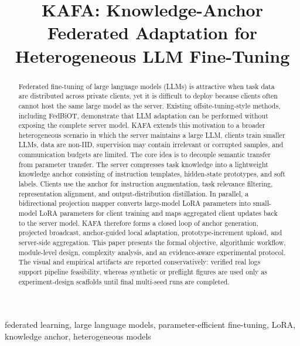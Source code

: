 \documentclass[conference]{IEEEtran}
\begin{document}
\title{KAFA: Knowledge-Anchor Federated Adaptation for Heterogeneous LLM Fine-Tuning}

\author{
}

\maketitle

\begin{abstract}
Federated fine-tuning of large language models (LLMs) is attractive when task data are distributed across private clients, yet it is difficult to deploy because clients often cannot host the same large model as the server. Existing offsite-tuning-style methods, including FedBiOT, demonstrate that LLM adaptation can be performed without exposing the complete server model. KAFA extends this motivation to a broader heterogeneous scenario in which the server maintains a large LLM, clients train smaller LLMs, data are non-IID, supervision may contain irrelevant or corrupted samples, and communication budgets are limited. The core idea is to decouple semantic transfer from parameter transfer. The server compresses task knowledge into a lightweight knowledge anchor consisting of instruction templates, hidden-state prototypes, and soft labels. Clients use the anchor for instruction augmentation, task relevance filtering, representation alignment, and output-distribution distillation. In parallel, a bidirectional projection mapper converts large-model LoRA parameters into small-model LoRA parameters for client training and maps aggregated client updates back to the server model. KAFA therefore forms a closed loop of anchor generation, projected broadcast, anchor-guided local adaptation, prototype-increment upload, and server-side aggregation. This paper presents the formal objective, algorithmic workflow, module-level design, complexity analysis, and an evidence-aware experimental protocol. The visual and empirical artifacts are reported conservatively: verified real logs support pipeline feasibility, whereas synthetic or preflight figures are used only as experiment-design scaffolds until final multi-seed runs are completed.
\end{abstract}

\begin{IEEEkeywords}
federated learning, large language models, parameter-efficient fine-tuning, LoRA, knowledge anchor, heterogeneous models
\end{IEEEkeywords}
\end{document}
